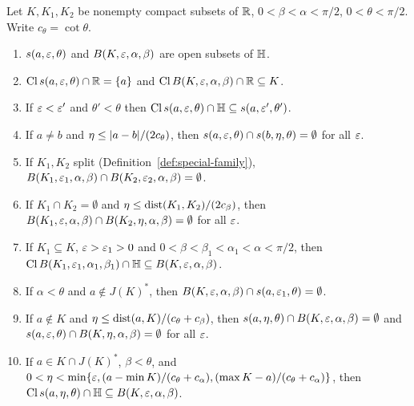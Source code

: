 \begin{lemma}\label{lem:region-geometry}
Let $K,K_1,K_2$ be nonempty compact subsets of $\mathbb{R}$, $0<\beta<\alpha<\pi/2$, $0<\theta<\pi/2$. Write
$c_\theta=\cot\theta$.
\begin{enumerate}[label=(R\arabic*)]
\item $s(a,\varepsilon,\theta)$ and $B(K,\varepsilon,\alpha,\beta)$ are open subsets of $\mathbb{H}$.
\item $\operatorname{Cl} s(a,\varepsilon,\theta)\cap\mathbb{R}=\{a\}$ and $\operatorname{Cl} B(K,\varepsilon,\alpha,\beta)\cap\mathbb{R}\subseteq K$.
\item If $\varepsilon<\varepsilon'$ and $\theta'<\theta$ then $\operatorname{Cl} s(a,\varepsilon,\theta)\cap\mathbb{H}\subseteq s(a,\varepsilon',\theta')$.
\item If $a\ne b$ and $\eta\le\lvert a-b\rvert/(2c_\theta)$, then $s(a,\varepsilon,\theta)\cap s(b,\eta,\theta)=\emptyset$ for all $\varepsilon$.
\item If $K_1,K_2$ split (Definition~\ref{def:special-family}), $B(K_1,\varepsilon_1,\alpha,\beta)\cap B(K_2,\varepsilon_2,\alpha,\beta)=\emptyset$.
\item If $K_1\cap K_2=\emptyset$ and $\eta\le\operatorname{dist}(K_1,K_2)/(2c_\beta)$, then
  $B(K_1,\varepsilon,\alpha,\beta)\cap B(K_2,\eta,\alpha,\beta)=\emptyset$ for all $\varepsilon$.
\item If $K_1\subseteq K$, $\varepsilon>\varepsilon_1>0$ and $0<\beta<\beta_1<\alpha_1<\alpha<\pi/2$, then
  $\operatorname{Cl} B(K_1,\varepsilon_1,\alpha_1,\beta_1)\cap\mathbb{H}\subseteq B(K,\varepsilon,\alpha,\beta)$.
\item If $\alpha<\theta$ and $a\notin J(K)^*$, then $B(K,\varepsilon,\alpha,\beta)\cap s(a,\varepsilon_1,\theta)=\emptyset$.
\item If $a\notin K$ and $\eta\le\operatorname{dist}(a,K)/(c_\theta+c_\beta)$, then $s(a,\eta,\theta)\cap B(K,\varepsilon,\alpha,\beta)=\emptyset$
  and $s(a,\varepsilon,\theta)\cap B(K,\eta,\alpha,\beta)=\emptyset$ for all $\varepsilon$.
\item If $a\in K\cap J(K)^*$, $\beta<\theta$, and $0<\eta<\min\{\varepsilon,(a-\min K)/(c_\theta+c_\alpha),(\max K-a)/(c_\theta+c_\alpha)\}$,
  then $\operatorname{Cl} s(a,\eta,\theta)\cap\mathbb{H}\subseteq B(K,\varepsilon,\alpha,\beta)$.
\end{enumerate}
\end{lemma}
